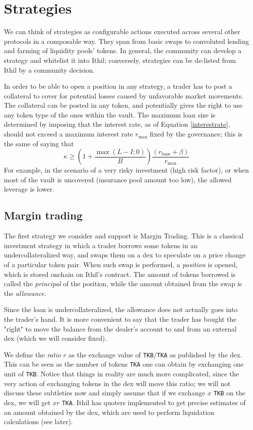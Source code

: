 \documentclass[a4paper,10 pt]{article}
\theoremstyle{definition}
\begin{document}
\section{Strategies}
We can think of strategies as configurable actions executed across several other protocols in a composable way. They span from basic swaps to convoluted lending and farming of liquidity pools' tokens. In general, the community can develop a strategy and whitelist it into Ithil; conversely, strategies can be de-listed from Ithil by a community decision.

In order to be able to open a position in any strategy, a trader has to post a collateral to cover for potential losses caused by unfavorable market movements. The collateral can be posted in any token, and potentially gives the right to use any token type of the ones within the vault. The maximum loan size is determined by imposing that the interest rate, as of Equation \eqref{interestrate}, should not exceed a maximum interest rate $r_{\text{max}}$ fixed by the governance; this is the same of saying that 
$$\kappa \ge  \left(1+\frac{\max{(L-I;0)}}{B}\right)\frac{(r_{\text{base}} + \beta)}{r_{\text{max}}}$$
 For example, in the scenario of a very risky investment (high risk factor), or when most of the vault is uncovered (insurance pool amount too low), the allowed leverage is lower.

\subsection{Margin trading}

The first strategy we consider and support is Margin Trading. This is a classical investment strategy in which a trader borrows some tokens in an undercollateralized way, and swaps them on a dex to speculate on a price change of a particular token pair. When such swap is performed, a {\it position} is opened, which is stored onchain on Ithil's contract. The amount of tokens borrowed is called the {\it principal} of the position, while the amount obtained from the swap is the {\it allowance}.

Since the loan is undercollateralized, the allowance does not actually goes into the trader's hand. It is more convenient to say that the trader has bought the "right" to move the balance from the dealer's account to and from an external dex (which we will consider fixed).

We define the {\it ratio} $r$ as the exchange value of \verb|TKB|/\verb|TKA| as published by the dex. This can be seen as the number of tokens \verb|TKA| one can obtain by exchanging one unit of \verb|TKB|. Notice that things in reality are much more complicated, since the very action of exchanging tokens in the dex will move this ratio; we will not discuss these subtleties now and simply assume that if we exchange $x$ \verb|TKB| on the dex, we will get $xr$ \verb|TKA|. Ithil has quoters implemented to get precise estimates of an amount obtained by the dex, which are used to perform liquidation calculations (see later).
\end{document}
